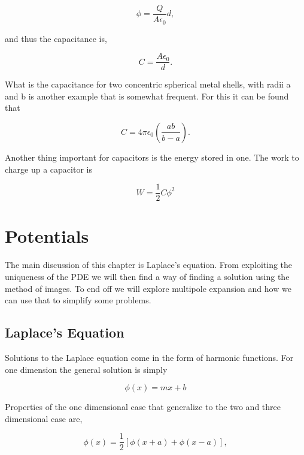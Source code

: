 \documentclass[preprint, review,12pt]{elsarticle}
\def\9{\left(}
\def\0{\right)}
\begin{document}
\begin{equation}
    \phi = \frac{Q}{A\epsilon_0}d,
\end{equation}

and thus the capacitance is,

\begin{equation}
    C = \frac{A\epsilon_0}{d}.
\end{equation}

What is the capacitance for two concentric spherical metal shells, with radii a and b is another example that is somewhat frequent. For this it can be found that

\begin{equation}
    C = 4\pi \epsilon_0 \9 \frac{ab}{b-a} \0.
\end{equation}

Another thing important for capacitors is the energy stored in one. The work to charge up a capacitor is

\begin{equation}
    W = \frac{1}{2}C \phi^2
\end{equation}

\section{Potentials}

The main discussion of this chapter is Laplace's equation. From exploiting the uniqueness of the PDE we will then find a way of finding a solution using the method of images. To end off we will explore multipole expansion and how we can use that to simplify some problems.

\subsection{Laplace's Equation}

Solutions to the Laplace equation come in the form of harmonic functions. For one dimension the general solution is simply

\begin{equation}
    \phi(x) = mx + b
\end{equation}

Properties of the one dimensional case that generalize to the two and three dimensional case are,

\begin{equation}
    \phi(x) = \frac{1}{2}[\phi(x+a) + \phi(x-a)],
\end{equation}
\end{document}
